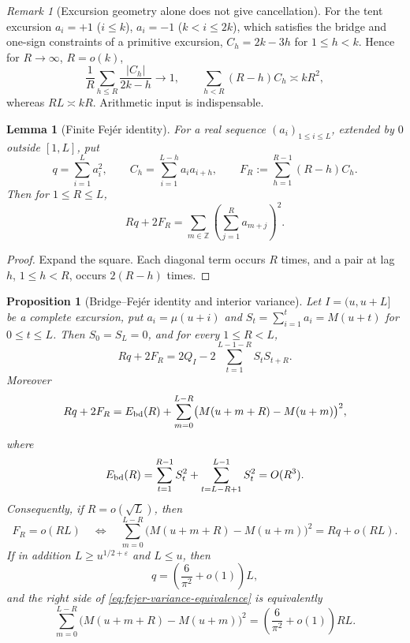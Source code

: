 \documentclass[11pt]{amsart}
\numberwithin{equation}{section}
\theoremstyle{plain}
\newtheorem{proposition}[theorem]{Proposition}
\newtheorem{lemma}[theorem]{Lemma}
\theoremstyle{definition}
\theoremstyle{remark}
\newtheorem{remark}[theorem]{Remark}
\newcommand{\eps}{\varepsilon}
\begin{document}
\begin{remark}[Excursion geometry alone does not give cancellation]
\label{rem:tent-chowla}
For the tent excursion $a_i=+1$ ($i\le k$), $a_i=-1$ ($k<i\le2k$), which
satisfies the bridge and one-sign constraints of a primitive excursion,
$C_h=2k-3h$ for $1\le h<k$. Hence for $R\to\infty$, $R=o(k)$,
\[
\frac1R\sum_{h\le R}\frac{|C_h|}{2k-h}\longrightarrow1,
\qquad
\sum_{h<R}(R-h)C_h\asymp kR^2,
\]
whereas $RL\asymp kR$. Arithmetic input is indispensable.
\end{remark}

\begin{lemma}[Finite Fej\'er identity]
\label{lem:fejer}
For a real sequence $(a_i)_{1\le i\le L}$, extended by $0$ outside
$[1,L]$, put
\[
q=\sum_{i=1}^La_i^2,
\qquad
C_h=\sum_{i=1}^{L-h}a_ia_{i+h},
\qquad
F_R:=\sum_{h=1}^{R-1}(R-h)C_h.
\]
Then for $1\le R\le L$,
\begin{equation}
\label{eq:fejer}
Rq+2F_R
=\sum_{m\in\mathbb Z}\left(\sum_{j=1}^{R}a_{m+j}\right)^2.
\end{equation}
\end{lemma}

\begin{proof}
Expand the square. Each diagonal term occurs $R$ times, and a pair at lag
$h$, $1\le h<R$, occurs $2(R-h)$ times.
\end{proof}

\begin{proposition}[Bridge--Fej\'er identity and interior variance]
\label{prop:bridge-fejer}
Let $I=(u,u+L]$ be a complete excursion, put
$a_i=\mu(u+i)$ and
$S_t=\sum_{i=1}^ta_i=M(u+t)$ for $0\le t\le L$. Then
$S_0=S_L=0$, and for every $1\le R<L$,
\begin{equation}
\label{eq:bridge-fejer-Q}
Rq+2F_R
=2Q_I-2\sum_{t=1}^{L-1-R}S_tS_{t+R}.
\end{equation}
Moreover
\begin{equation}
\label{eq:fejer-interior-boundary}
Rq+2F_R
=E_{\rm bd}(R)
+\sum_{m=0}^{L-R}\bigl(M(u+m+R)-M(u+m)\bigr)^2,
\end{equation}
where
\[
E_{\rm bd}(R)=\sum_{t=1}^{R-1}S_t^2
+\sum_{t=L-R+1}^{L-1}S_t^2
=O(R^3).
\]
Consequently, if $R=o(\sqrt L)$, then
\begin{equation}
\label{eq:fejer-variance-equivalence}
F_R=o(RL)
\quad\Longleftrightarrow\quad
\sum_{m=0}^{L-R}\bigl(M(u+m+R)-M(u+m)\bigr)^2
=Rq+o(RL).
\end{equation}
If in addition $L\ge u^{1/2+\eps}$ and $L\le u$, then
\begin{equation}
\label{eq:q-squarefree-local}
q=\left(\frac6{\pi^2}+o(1)\right)L,
\end{equation}
and the right side of \eqref{eq:fejer-variance-equivalence} is equivalently
\begin{equation}
\label{eq:local-variance-diagonal}
\sum_{m=0}^{L-R}\bigl(M(u+m+R)-M(u+m)\bigr)^2
=\left(\frac6{\pi^2}+o(1)\right)RL.
\end{equation}
\end{proposition}
\end{document}
